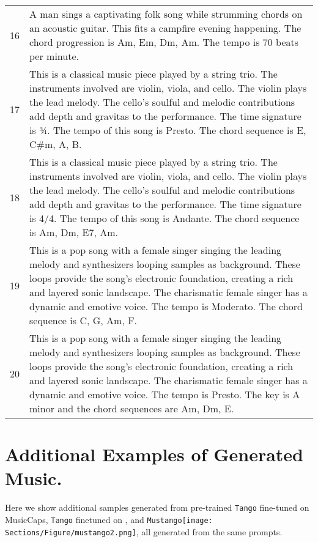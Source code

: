 \documentclass[11pt]{article}
\newcommand{\model}{\texttt{Mustango}}
\newcommand{\modelemoji}{\model{}\texttt{[image: Sections/Figure/mustango2.png]}}
\begin{document}
\begin{table*}[h]
\begin{tabular}{p{0.4cm} p{15cm}}
16& A man sings a captivating folk song while strumming chords on an acoustic guitar. This fits a campfire evening happening. The chord progression is Am, Em, Dm, Am. The tempo is 70 beats per minute.                                    \\
17& This is a classical music piece played by a string trio. The instruments involved are violin, viola, and cello. The violin plays the lead melody. The cello's soulful and melodic contributions add depth and gravitas to the performance. The time signature is ¾. The tempo of this song is Presto. The chord sequence is E, C\#m, A, B.           \\
18& This is a classical music piece played by a string trio. The instruments involved are violin, viola, and cello. The violin plays the lead melody. The cello's soulful and melodic contributions add depth and gravitas to the performance. The time signature is 4/4. The tempo of this song is Andante. The chord sequence is Am, Dm, E7, Am.   \\
19& This is a pop song with a female singer singing the leading melody and synthesizers looping samples as background. These loops provide the song's electronic foundation, creating a rich and layered sonic landscape. The charismatic female singer has a dynamic and emotive voice. The tempo is Moderato. The chord sequence is                                                                                                               C, G, Am, F. \\
20& This is a pop song with a female singer singing the leading melody and synthesizers looping samples as background. These loops provide the song's electronic foundation, creating a rich and layered sonic landscape. The charismatic female singer has a dynamic and emotive voice. The tempo is Presto. The key is A minor and the chord sequences are Am, Dm, E.   \\ \bottomrule
\end{tabular}
\end{table*}








\clearpage
\FloatBarrier
\section{Additional Examples of Generated Music. }
\label{app:examples}
\FloatBarrier
Here we show additional samples generated from pre-trained \texttt{Tango} fine-tuned on MusicCaps, \texttt{Tango} finetuned on \dataset{}, and \modelemoji{}, all generated from the same prompts.\\
\end{document}
